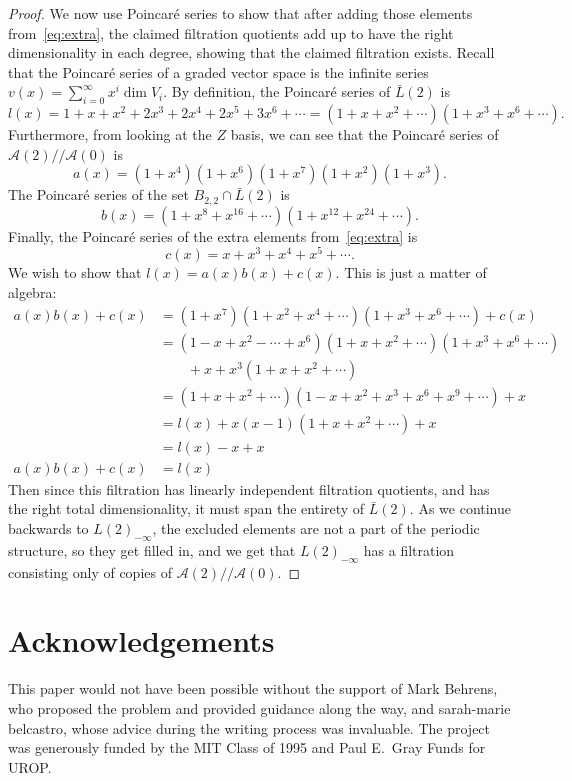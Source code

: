 \documentclass{article}
\newcommand{\A}{\mathcal{A}}
\newcommand{\mmod}{/\!/\!}
\renewcommand{\L}{\bar{L}}
\newcommand{\Lkm}[1][k]{L{(#1)}_{-\infty}}
\begin{document}
\begin{proof}
  We now use Poincar\'e series to show that after adding those elements from~\eqref{eq:extra}, the claimed filtration quotients add up to have the right dimensionality in each degree, showing that the claimed filtration exists.  Recall that the Poincar\'e series of a graded vector space is the infinite series $v(x) = \sum_{i=0}^{\infty} x^i \dim V_i$.  By definition, the Poincar\'e series of $\L(2)$ is
  \[ l(x) = 1 + x + x^2 + 2x^3 + 2x^4 + 2x^5 + 3x^6 + \cdots = (1 + x + x^2 + \cdots)(1 + x^3 + x^6 + \cdots).\]
  Furthermore, from looking at the $Z$ basis, we can see that the Poincar\'e series of $\A(2)\mmod\A(0)$ is
  \[ a(x) = (1+x^4)(1+x^6)(1+x^7)(1+x^2)(1+x^3).\]
  The Poincar\'e series of the set $B_{2,2}\cap \L(2)$ is
  \[ b(x) = (1 + x^8 + x^{16} + \cdots)(1 + x^{12} + x^{24} + \cdots).\]
  Finally, the Poincar\'e series of the extra elements from~\eqref{eq:extra} is
  \[ c(x) = x + x^3 + x^4 + x^5 + \cdots.\]
  We wish to show that $l(x) = a(x)b(x) + c(x)$.  This is just a matter of algebra:
  \begin{align*}
    a(x)b(x) + c(x) &= (1+x^7)(1 + x^2 + x^4 + \cdots)(1 + x^3 + x^6 + \cdots) + c(x) \\
                    &= (1-x+x^2-\cdots+x^6)(1 + x + x^2 + \cdots)(1 + x^3 + x^6 + \cdots) \\
                    &\qquad + x + x^3(1 + x + x^2 + \cdots) \\
                    &= (1 + x + x^2 + \cdots)(1 - x + x^2 + x^3 + x^6 + x^9 + \cdots) + x \\
                    &= l(x) + x(x-1)(1 + x + x^2 + \cdots) + x \\
                    &= l(x) - x + x \\
    a(x)b(x) + c(x) &= l(x)
  \end{align*}
  Then since this filtration has linearly independent filtration quotients, and has the right total dimensionality, it must span the entirety of $\L(2)$.  As we continue backwards to $\Lkm[2]$, the excluded elements are not a part of the periodic structure, so they get filled in, and we get that $\Lkm[2]$ has a filtration consisting only of copies of $\A(2)\mmod\A(0)$.
\end{proof}

\section{Acknowledgements}

This paper would not have been possible without the support of Mark Behrens, who proposed the problem and provided guidance along the way, and sarah-marie belcastro, whose advice during the writing process was invaluable.  The project was generously funded by the MIT Class of 1995 and Paul E.~Gray Funds for UROP.

\printbibliography
\end{document}
